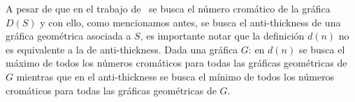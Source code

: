 A pesar de que en el trabajo de~\cite{Araujo2005} se busca el número cromático
de la gráfica $D(S)$ y con ello, como mencionamos antes, se busca el
anti-thickness de una gráfica geométrica asociada a $S$, es importante notar
que la definición $d(n)$ no es equivalente a la de anti-thickness. Dada una
gráfica $G$: en $d(n)$ se busca el máximo de todos los números cromáticos para
todas las gráficas geométricas de $G$ mientras que en el anti-thickness se
busca el mínimo de todos los números cromáticos para todas las gráficas
geométricas de $G$.



%
%

